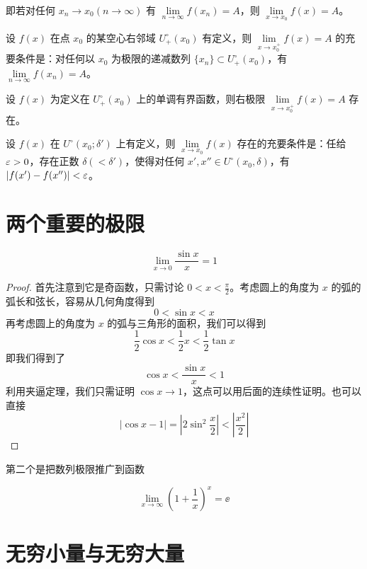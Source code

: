 即若对任何 $x_n\to x_0(n\to \infty)$ 有 $\lim\limits_{n\to \infty}f(x_n) = A$，则 $\lim\limits_{x \to x_0}f(x)=A$。

\begin{theorem}
	设 $f(x)$ 在点 $x_0$ 的某空心右邻域 $U_+^\circ(x_0)$ 有定义，则 $\lim\limits_{x \to x_0^+}f(x)=A$ 的充要条件是：对任何以 $x_0$ 为极限的递减数列 $\{x_n\}\subset U_+^\circ(x_0)$，有 $\lim\limits_{n\to \infty}f(x_n) = A$。
\end{theorem}

\begin{theorem}
	设 $f(x)$ 为定义在 $U_+^\circ(x_0)$ 上的单调有界函数，则右极限 $\lim\limits_{x \to x_0^+}f(x)=A$ 存在。
\end{theorem}

\begin{theorem}[Cauchy 准则]
	设 $f(x)$ 在 $U^\circ(x_0;\delta')$ 上有定义，则 $\lim\limits_{x \to x_0}f(x)$ 存在的充要条件是：任给 $\varepsilon > 0$，存在正数 $\delta(<\delta')$，使得对任何 $x',x''\in U^\circ(x_0,\delta)$，有 $|f(x')-f(x'')|<\varepsilon$。
\end{theorem}

\section{两个重要的极限}

\begin{proposition}
	\[ \lim_{x \to 0}\frac{\sin x}{x} = 1 \]
\end{proposition}

\begin{proof}
	首先注意到它是奇函数，只需讨论 $0 < x < \frac{\pi}{2}$。考虑圆上的角度为 $x$ 的弧的弧长和弦长，容易从几何角度得到
	\[ 0 < \sin x < x \]
	再考虑圆上的角度为 $x$ 的弧与三角形的面积，我们可以得到
	\[ \frac{1}{2}\cos x < \frac{1}{2} x < \frac{1}{2} \tan x \]
	即我们得到了
	\[ \cos x < \frac{\sin x}{x} < 1 \]
	利用夹逼定理，我们只需证明 $\cos x \to 1$，这点可以用后面的连续性证明。也可以直接
	\[ |\cos x - 1| = \left| 2 \sin^2 \frac{x}{2} \right| < \left|  \frac{x^2}{2} \right| \]
\end{proof}

第二个是把数列极限推广到函数

\begin{proposition}
	\[ \lim_{x \to \infty}\left(1+\frac{1}{x}\right)^x = \ee \]
\end{proposition}


\section{无穷小量与无穷大量}

